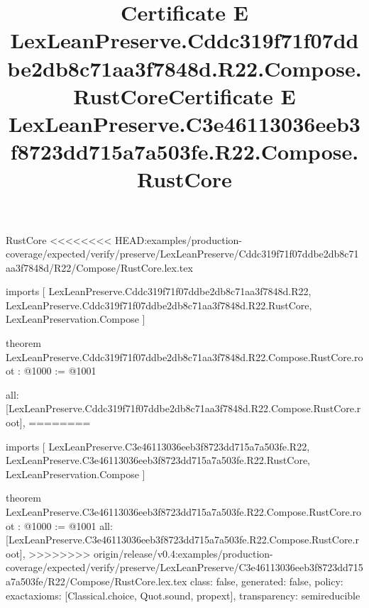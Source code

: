 \begin{lexlean}{RustCore}
<<<<<<<< HEAD:examples/production-coverage/expected/verify/preserve/LexLeanPreserve/Cddc319f71f07ddbe2db8c71aa3f7848d/R22/Compose/RustCore.lex.tex
\title{Certificate E LexLeanPreserve.Cddc319f71f07ddbe2db8c71aa3f7848d.R22.Compose.RustCore}
\begin{coremodule}
imports [
  LexLeanPreserve.Cddc319f71f07ddbe2db8c71aa3f7848d.R22,
  LexLeanPreserve.Cddc319f71f07ddbe2db8c71aa3f7848d.R22.RustCore,
  LexLeanPreservation.Compose
]

theorem LexLeanPreserve.Cddc319f71f07ddbe2db8c71aa3f7848d.R22.Compose.RustCore.root : @1000 := @1001 {
  all: [LexLeanPreserve.Cddc319f71f07ddbe2db8c71aa3f7848d.R22.Compose.RustCore.root],
========
\title{Certificate E LexLeanPreserve.C3e46113036eeb3f8723dd715a7a503fe.R22.Compose.RustCore}
\begin{coremodule}
imports [
  LexLeanPreserve.C3e46113036eeb3f8723dd715a7a503fe.R22,
  LexLeanPreserve.C3e46113036eeb3f8723dd715a7a503fe.R22.RustCore,
  LexLeanPreservation.Compose
]

theorem LexLeanPreserve.C3e46113036eeb3f8723dd715a7a503fe.R22.Compose.RustCore.root : @1000 := @1001 {
  all: [LexLeanPreserve.C3e46113036eeb3f8723dd715a7a503fe.R22.Compose.RustCore.root],
>>>>>>>> origin/release/v0.4:examples/production-coverage/expected/verify/preserve/LexLeanPreserve/C3e46113036eeb3f8723dd715a7a503fe/R22/Compose/RustCore.lex.tex
  class: false,
  generated: false,
  policy: exact{axioms: [Classical.choice, Quot.sound, propext]},
  transparency: semireducible
}


\end{coremodule}}
\end{coremodule}
\end{lexlean}
